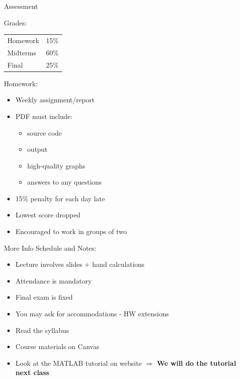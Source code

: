\documentclass[10pt]{beamer}
\begin{document}
\begin{frame}{Assessment}

Grades:
\begin{tabular}{l l}
Homework       & 15\%\\
Midterms   & 60\%\\
Final     & 25\%\\
\end{tabular}
   \vspace{1em}

   Homework: 
\begin{itemize}
\item Weekly assignment/report
\item PDF must include: 
\begin{itemize}
    \item source code 
    \item output
    \item high-quality graphs
    \item answers to any questions  
\end{itemize}
\item 15\% penalty for each day late 
\item Lowest score dropped
\item Encouraged to work in groups of two
\end{itemize}
\end{frame}
\begin{frame}{More Info}
\bigskip
Schedule and Notes:
\begin{itemize}
    \item Lecture involves slides + hand calculations 
    \item Attendance is mandatory
    \item Final exam is fixed
       \bigskip
   \item You may ask for accommodations - HW extensions 
   \item Read the syllabus
   \item Course materials on Canvas
   \item Look at the MATLAB tutorial on website\newline
      $\Rightarrow$ \textbf{We will do the tutorial next class}
\end{itemize}


\bigskip
   
\end{frame}
\end{document}
